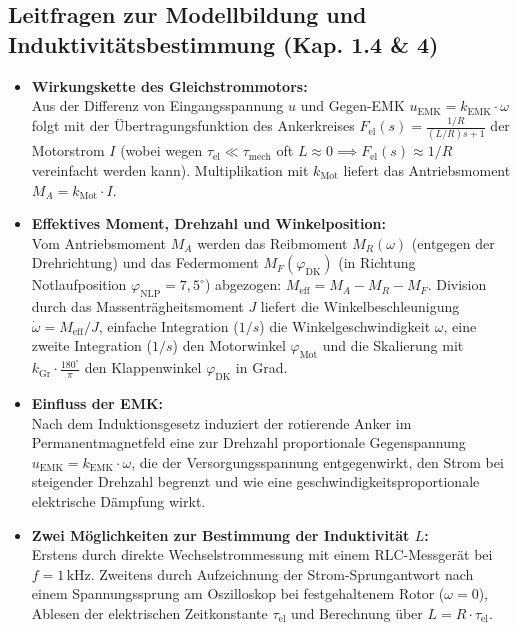 \documentclass[a4paper,10pt,department=FakEI]{OTHRartcl}
\begin{document}
\subsection{Leitfragen zur Modellbildung und Induktivitätsbestimmung (Kap. 1.4 \& 4)}
\begin{itemize}\setlength{\itemsep}{3pt}
    \item \textbf{Wirkungskette des Gleichstrommotors:}\\
    Aus der Differenz von Eingangsspannung $u$ und Gegen-EMK $u_{\text{EMK}} = k_{\text{EMK}} \cdot \omega$ folgt mit der Übertragungsfunktion des Ankerkreises $F_{\text{el}}(s) = \frac{1/R}{(L/R)s + 1}$ der Motorstrom $I$ (wobei wegen $\tau_{\text{el}} \ll \tau_{\text{mech}}$ oft $L \approx 0 \implies F_{\text{el}}(s) \approx 1/R$ vereinfacht werden kann). Multiplikation mit $k_{\text{Mot}}$ liefert das Antriebsmoment $M_A = k_{\text{Mot}} \cdot I$.
    \item \textbf{Effektives Moment, Drehzahl und Winkelposition:}\\
    Vom Antriebsmoment $M_A$ werden das Reibmoment $M_R(\omega)$ (entgegen der Drehrichtung) und das Federmoment $M_F(\varphi_{\text{DK}})$ (in Richtung Notlaufposition $\varphi_{\text{NLP}} = 7{,}5^\circ$) abgezogen: $M_{\text{eff}} = M_A - M_R - M_F$. Division durch das Massenträgheitsmoment $J$ liefert die Winkelbeschleunigung $\dot{\omega} = M_{\text{eff}}/J$, einfache Integration ($1/s$) die Winkelgeschwindigkeit $\omega$, eine zweite Integration ($1/s$) den Motorwinkel $\varphi_{\text{Mot}}$ und die Skalierung mit $k_{\text{Gr}} \cdot \frac{180^\circ}{\pi}$ den Klappenwinkel $\varphi_{\text{DK}}$ in Grad.
    \item \textbf{Einfluss der EMK:}\\
    Nach dem Induktionsgesetz induziert der rotierende Anker im Permanentmagnetfeld eine zur Drehzahl proportionale Gegenspannung $u_{\text{EMK}} = k_{\text{EMK}} \cdot \omega$, die der Versorgungsspannung entgegenwirkt, den Strom bei steigender Drehzahl begrenzt und wie eine geschwindigkeitsproportionale elektrische Dämpfung wirkt.
    \item \textbf{Zwei Möglichkeiten zur Bestimmung der Induktivität $L$:}\\
    Erstens durch direkte Wechselstrommessung mit einem RLC-Messgerät bei $f = 1\,\text{kHz}$. Zweitens durch Aufzeichnung der Strom-Sprungantwort nach einem Spannungssprung am Oszilloskop bei festgehaltenem Rotor ($\omega = 0$), Ablesen der elektrischen Zeitkonstante $\tau_{\text{el}}$ und Berechnung über $L = R \cdot \tau_{\text{el}}$.
\end{itemize}
\end{document}

